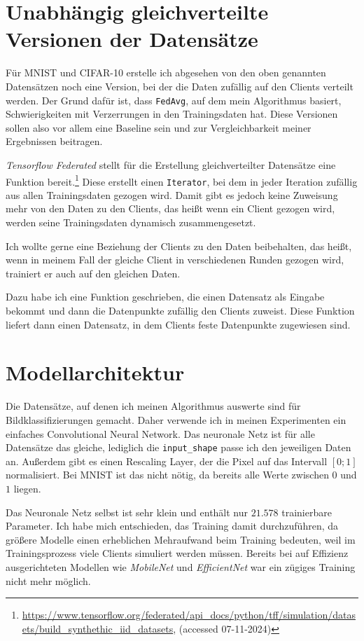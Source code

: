 \section{Unabhängig gleichverteilte Versionen der Datensätze}\label{sec:iid-dataset-creation}
Für MNIST und CIFAR-10 erstelle ich abgesehen von den oben genannten Datensätzen noch eine Version, bei der die Daten zufällig auf den Clients verteilt werden. Der Grund dafür ist, dass \texttt{FedAvg}, auf dem mein Algorithmus basiert, Schwierigkeiten mit Verzerrungen in den Trainingsdaten hat. Diese Versionen sollen also vor allem eine Baseline sein und zur Vergleichbarkeit meiner Ergebnissen beitragen.

\textit{Tensorflow Federated} stellt für die Erstellung gleichverteilter Datensätze eine Funktion bereit.\footnote{\url{https://www.tensorflow.org/federated/api_docs/python/tff/simulation/datasets/build_synthethic_iid_datasets}, (accessed 07-11-2024)} Diese erstellt einen \texttt{Iterator}, bei dem in jeder Iteration zufällig aus allen Trainingsdaten gezogen wird. Damit gibt es jedoch keine Zuweisung mehr von den Daten zu den Clients, das heißt wenn ein Client gezogen wird, werden seine Trainingsdaten dynamisch zusammengesetzt.

Ich wollte gerne eine Beziehung der Clients zu den Daten beibehalten, das heißt, wenn in meinem Fall der gleiche Client in verschiedenen Runden gezogen wird, trainiert er auch auf den gleichen Daten.

Dazu habe ich eine Funktion geschrieben, die einen Datensatz als Eingabe bekommt und dann die Datenpunkte zufällig den Clients zuweist. Diese Funktion liefert dann einen Datensatz, in dem Clients feste Datenpunkte zugewiesen sind.

\section{Modellarchitektur}
Die Datensätze, auf denen ich meinen Algorithmus auswerte sind für Bildklassifizierungen gemacht. Daher verwende ich in meinen Experimenten ein einfaches Convolutional Neural Network. Das neuronale Netz ist für alle Datensätze das gleiche, lediglich die \texttt{input\_shape} passe ich den jeweiligen Daten an. Außerdem gibt es einen Rescaling Layer, der die Pixel auf das Intervall $[0;1]$ normalisiert. Bei MNIST ist das nicht nötig, da bereits alle Werte zwischen $0$ und $1$ liegen.

Das Neuronale Netz selbst ist sehr klein und enthält nur $21.578$ trainierbare Parameter. Ich habe mich entschieden, das Training damit durchzuführen, da größere Modelle einen erheblichen Mehraufwand beim Training bedeuten, weil im Trainingsprozess viele Clients simuliert werden müssen. Bereits bei auf Effizienz ausgerichteten Modellen wie \textit{MobileNet} \cite{howard:2017} und \textit{EfficientNet} \cite{tan:2019} war ein zügiges Training nicht mehr möglich.

